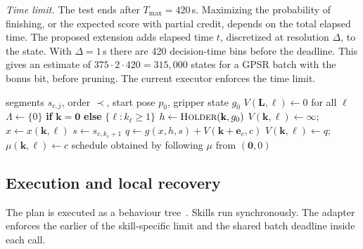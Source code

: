 \documentclass[conference]{IEEEtran}
\newcommand{\todo}[1]{}
\newcommand{\todo}[1]{\textcolor{red}{[TODO: #1]}}
\newcommand{\pre}{\prec}
\begin{document}
\emph{Time limit.} The test ends after $T_{\max}=420$\,s. Maximizing the
probability of finishing, or the expected score with partial credit,
depends on the total elapsed time. The proposed extension adds elapsed
time $t$, discretized at resolution $\Delta$, to the state. With
$\Delta=1$\,s there are 420 decision-time bins before the deadline.
This gives an estimate of $375\cdot2\cdot420=315{,}000$ states for a
GPSR batch with the bonus bit, before pruning. The current executor
enforces the time limit.
\todo{Measure solve time and consider a coarser $\Delta$.}

\begin{algorithm}[t]
\caption{Interleaving by progress-vector DP}\label{alg:dp}
\begin{algorithmic}[1]
\Require segments $s_{c,j}$, order $\pre$, start pose $p_0$, gripper state $g_0$
\State $V(\mathbf{L},\ell)\gets 0$ for all $\ell$ 
  \State $\Lambda\gets\{0\}$ \textbf{if} $\mathbf{k}=\mathbf{0}$ \textbf{else} $\{\ell: k_\ell\ge1\}$
  \State $h\gets\textsc{Holder}(\mathbf{k},g_0)$
  \For{$\ell\in\Lambda$}
    \State $V(\mathbf{k},\ell)\gets\infty$;\; $x\gets x(\mathbf{k},\ell)$
      \State $s\gets s_{c,k_c+1}$
        \State $q\gets g(x,h,s)+V(\mathbf{k}+\mathbf{e}_c,c)$
          \State $V(\mathbf{k},\ell)\gets q$;\; $\mu(\mathbf{k},\ell)\gets c$
        \EndIf
      \EndIf
    \EndFor
  \EndFor
\EndFor
\State \Return schedule obtained by following $\mu$ from $(\mathbf{0},0)$
\end{algorithmic}
\end{algorithm}

\subsection{Execution and local recovery}\label{sec:execution}
The plan is executed as a behaviour tree~\todo{cite py\_trees}. Skills run
synchronously. The adapter enforces the earlier of the skill-specific limit
and the shared batch deadline inside each call.
\todo{Implement non-blocking leaves.}
\end{document}
